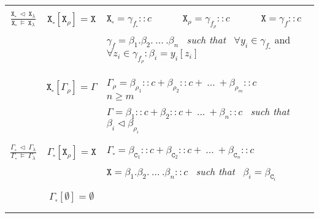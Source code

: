 \documentclass{entcs}
\renewcommand{\~}[0]{\texttildelow}
\begin{document}
\begin{defn}
\begin{center}
{\begin{tabular}{ c | | c | l }
    & & \\[0.02cm]
    \hline
    & & \\[0.02cm]

    $\frac{\mathtt{X}_{\square}~\lhd~\mathtt{X}_{\lambda}}{\mathtt{X}_{\square}~\models~\mathtt{X}_{\lambda}}$ & 
    $ \mathtt{X}_{\square}[\mathtt{X}_\rho] = \mathtt{X} $ & 
    $ \mathtt{X}_{\square} = \gamma_{f_{\square}}::c$ ~~~~~ $ \mathtt{X}_\rho = \gamma_{f_\rho}::c $ ~~~~~ $ \mathtt{X} = \gamma_{f}::c $\\

     &  & $\gamma_{f} = \beta_1.\beta_2.~...~.\beta_n $~ \emph{such that} ~$ \forall y_i \in \gamma_{f_{\square}}$ and $ \forall z_i \in \gamma_{f_\rho} : \beta_i = y_i[z_i]$ \\

	& & \\[0.02cm]
    \hline
    & & \\[0.02cm]

     & 
    $ \mathtt{X}_{\square}[\Gamma_\rho] = \Gamma $ & 
    $ \Gamma_\rho = \beta_{\rho_1}::c + \beta_{\rho_2}::c + ~...~+ \beta_{\rho_m}::c $ ~~~~~ $ n \geq m $\\

     &  & $ \Gamma = \beta_1::c + \beta_2::c + ~...~+ \beta_n::c $~ \emph{such that} ~$ \beta_i \lhd \beta_{\rho_i}$ \\

    & & \\[0.02cm]
    \hline
    & & \\[0.02cm]

	$ \frac{\Gamma_{\square}~\lhd~\Gamma_\lambda}{\Gamma_{\square}~\models~\Gamma_\lambda} $ & 
    $ \Gamma_{\square}[\mathtt{X}_\rho] = \mathtt{X} $ & 
    $ \Gamma_{\square} = \beta_{\mathtt{C}_1}::c + \beta_{\mathtt{C}_2}::c + ~...~+ \beta_{\mathtt{C}_n}::c $\\

     &  & $ \mathtt{X} = \beta_1.\beta_2.~...~.\beta_n::c $~ \emph{such that} ~$ \beta_i = \beta_{\mathtt{C}_i} $ \\

    & & \\[0.02cm]
    \hline
    & & \\[0.02cm]

	 & 
    $ \Gamma_{\square}[\emptyset] = \emptyset $ & \\

    & & \\[0.02cm]
    \hline
    & & \\[0.02cm]


\end{tabular}}
\end{center}
\end{defn}
\end{document}
